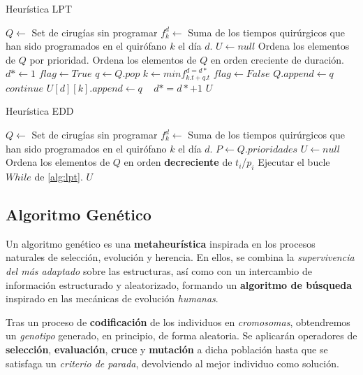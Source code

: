 \begin{algorithm}
\caption{Heurística LPT}\label{alg:lpt}
\begin{algorithmic}
\State $Q \gets $ Set de cirugías sin programar
\State $f_{k}^{d} \gets $ Suma de los tiempos quirúrgicos que han sido programados en el quirófano $k$ el día $d$.
\State $U \gets null$ 
 \State Ordena los elementos de $Q$ por prioridad.
 \State Ordena los elementos de $Q$ en orden creciente de duración.
\State $d* \gets 1$
\State $flag \gets True$
        \State $q \gets Q.pop$
        \State $k \gets min f_{k.t+q.t}^{d=d*}$
       \State $flag \gets False$
        \EndIf
        \State $Q.append \gets q$
        \State $continue$
        \EndIf
        \State $U[d][k].append \gets q$
        \
        \EndWhile
        \State $d* = d* + 1$
\EndWhile
\State \Return $U$
\end{algorithmic}
\end{algorithm}

\begin{algorithm}
\caption{Heurística EDD}\label{alg:lpt/edd}
\begin{algorithmic}
\State $Q \gets $ Set de cirugías sin programar
\State $f_{k}^{d} \gets $ Suma de los tiempos quirúrgicos que han sido programados en el quirófano $k$ el día $d$.
\State $P \gets Q.prioridades$
\State $U \gets null$ 
 \State Ordena los elementos de $Q$ en orden \textbf{decreciente} de $t_{i}$/$p_{i}$
\State Ejecutar el bucle $While$ de \ref{alg:lpt}.
\State \Return $U$
\end{algorithmic}
\end{algorithm}


\subsection{Algoritmo Genético}

Un algoritmo genético es una \textbf{metaheurística} inspirada en los procesos naturales de selección, evolución y herencia. En ellos, se combina la \textit{supervivencia del más adaptado} sobre las estructuras, así como con un intercambio de información estructurado y aleatorizado, formando un \textbf{algoritmo de búsqueda} inspirado en las mecánicas de evolución \textit{humanas}.  \cite{Goldberg1989GeneticLearning}


Tras un proceso de \textbf{codificación} de los individuos en \textit{cromosomas}, obtendremos un \textit{genotipo} generado, en principio, de forma aleatoria. Se aplicarán operadores de \textbf{selección}, \textbf{evaluación}, \textbf{cruce} y \textbf{mutación} a dicha población hasta que se satisfaga un \textit{criterio de parada}, devolviendo al mejor individuo como solución.

